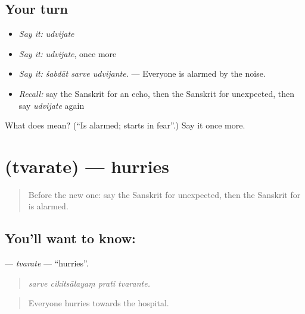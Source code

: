 \subsection*{Your turn}
\begin{itemize}
\raggedright
  \item \emph{Say it:} \emph{udvijate}
  \item \emph{Say it:} \emph{udvijate}, once more
  \item \emph{Say it:} \emph{śabdāt sarve udvijante.} — Everyone is alarmed by the noise.
  \item \emph{Recall:} say the Sanskrit for an echo, then the Sanskrit for unexpected, then say \emph{udvijate} again
\end{itemize}

\begin{tcolorbox}[breakable,colback=teal!4,colframe=teal!35!black,title={Before you move on}]
What does  mean? (\textquotedblleft{}Is alarmed; starts in fear\textquotedblright{}.) Say it once more.
\end{tcolorbox}
\section[\texorpdfstring{\sk{त्वरते} (tvarate)}{त्वरते (tvarate)}]{ (tvarate) — hurries}

\label{lesson:SA-C315-tvarate}



\begin{quote}
Before the new one: say the Sanskrit for unexpected, then the Sanskrit for is alarmed.
\end{quote}

\subsection*{You'll want to know: }
\textbf{} — \emph{tvarate} — \textquotedblleft{}hurries\textquotedblright{}.

\begin{quote}
   
\end{quote}

\begin{quote}
\emph{sarve cikitsālayaṃ prati tvarante.}
\end{quote}

\begin{quote}
Everyone hurries towards the hospital.
\end{quote}

